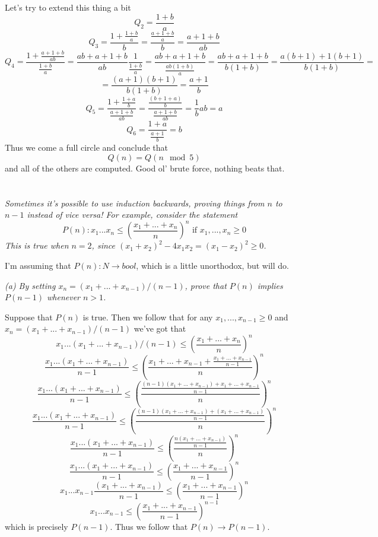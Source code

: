 \documentclass[11pt,oneside,titlepage]{book}
\begin{document}
Let's try to extend this thing a bit
$$Q_2 = \frac{1 + b}{a}$$
$$Q_3 = \frac{1 + \frac{1 + b}{a}}{b} =
\frac{\frac{a + 1 + b}{a}}{b} = \frac{a + 1 + b}{ab}
$$
$$Q_4 = \frac{1 + \frac{a + 1 + b}{ab}}{\frac{1 + b}{a}} =
\frac{ab + a + 1 + b}{ab} \frac{1}{\frac{1 + b}{a}} =
\frac{ab + a + 1 + b}{\frac{ab(1 + b)}{a}} =
\frac{ab + a + 1 + b}{b(1 + b)} = \frac{a(b + 1) + 1(b + 1)}{b(1 + b)} =
$$
$$ = 
\frac{(a + 1)(b + 1)}{b(1 + b)} = \frac{a + 1}{b}
$$
$$Q_5 = \frac{1 + \frac{1 + a}{b}}{\frac{a + 1 + b}{ab}} =
\frac{\frac{(b + 1 + a)}{b}}{\frac{a + 1 + b}{ab}} = \frac{1}{b} ab = a
$$
$$Q_6 = \frac{1 + a}{\frac{a + 1}{b}} = b$$
Thus we come a full circle and conclude that
$$Q(n) = Q(n \mod 5)$$
and all of the others are computed. Good ol' brute force, nothing beats that.

\section{}

\textit{Sometimes it's possible to use induction backwards, proving things from $n$
  to $n - 1$ instead of vice versa! For example, consider the statement}
$$P(n): x_1 ...  x_n \leq \left(\frac{x_1 + ... + x_n}{n}\right)^n
\text{ if } x_1 , ...,  x_n \geq 0$$
\textit{This is true when $n = 2$, since $(x_1 + x_2)^2 - 4x_1x_2 = (x_1 - x_2)^2 \geq 0$.}


I'm assuming that $P(n): N \to bool$, which is a little unorthodox, but will do.

\textit{(a) By setting $x_n = (x_1 + ... + x_{n - 1})/(n - 1)$, prove that $P(n)$ implies
  $P(n - 1)$ whenever $n > 1$.}

Suppose that $P(n)$ is true. Then we follow that for any $x_1, ..., x_{n - 1} \geq 0$ and
$x_n = (x_1 + ... + x_{n - 1})/(n - 1)$
we've got that 
$$x_1  ... (x_1 + ... + x_{n - 1})/(n - 1) \leq \left(\frac{x_1 + ... + x_n}{n}\right)^n$$
$$\frac{x_1  ... (x_1 + ... + x_{n - 1})}{n - 1} \leq \left(\frac{x_1 + ... + x_{n - 1} +
    \frac{x_1 + ... + x_{n - 1}}{n - 1}}{n}\right)^n$$
$$\frac{x_1  ... (x_1 + ... + x_{n - 1})}{n - 1} \leq \left(\frac{
    \frac{(n - 1)(x_1 + ... + x_{n - 1}) + x_1 + ... + x_{n - 1}}{n - 1}}{n}\right)^n$$
$$\frac{x_1  ... (x_1 + ... + x_{n - 1})}{n - 1} \leq \left(\frac{
    \frac{(n - 1)(x_1 + ... + x_{n - 1}) + (x_1 + ... + x_{n - 1})}{n - 1}}{n}\right)^n$$
$$\frac{x_1  ... (x_1 + ... + x_{n - 1})}{n - 1} \leq \left(\frac{
    \frac{n(x_1 + ... + x_{n - 1})}{n - 1}}{n}\right)^n$$
$$\frac{x_1  ... (x_1 + ... + x_{n - 1})}{n - 1} \leq \left(
  \frac{x_1 + ... + x_{n - 1}}{n - 1}\right)^n$$
$$x_1  ... x_{n - 1}\frac{(x_1 + ... + x_{n - 1})}{n - 1} \leq \left(
  \frac{x_1 + ... + x_{n - 1}}{n - 1}\right)^n$$
$$x_1  ... x_{n - 1} \leq \left( \frac{x_1 + ... + x_{n - 1}}{n - 1}\right)^{n - 1}$$
which is precisely $P(n - 1)$. Thus we follow that $P(n) \to P(n - 1)$.
\end{document}
